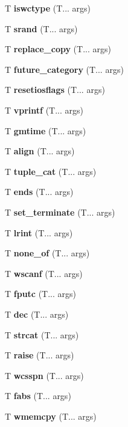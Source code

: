 \begin{DoxyCompactItemize}
T \textbf{ iswctype} (T... args)
\item 
\mbox{\label{srand}} 
T \textbf{ srand} (T... args)
\item 
\mbox{\label{replace_copy}} 
T \textbf{ replace\+\_\+copy} (T... args)
\item 
\mbox{\label{future_category}} 
T \textbf{ future\+\_\+category} (T... args)
\item 
\mbox{\label{resetiosflags}} 
T \textbf{ resetiosflags} (T... args)
\item 
\mbox{\label{vfprintf}} 
T \textbf{ vprintf} (T... args)
\item 
\mbox{\label{gmtime}} 
T \textbf{ gmtime} (T... args)
\item 
\mbox{\label{align}} 
T \textbf{ align} (T... args)
\item 
\mbox{\label{tuple_cat}} 
T \textbf{ tuple\+\_\+cat} (T... args)
\item 
\mbox{\label{ends}} 
T \textbf{ ends} (T... args)
\item 
\mbox{\label{set_terminate}} 
T \textbf{ set\+\_\+terminate} (T... args)
\item 
\mbox{\label{rint}} 
T \textbf{ lrint} (T... args)
\item 
\mbox{\label{all_any_none_of}} 
T \textbf{ none\+\_\+of} (T... args)
\item 
\mbox{\label{fwscanf}} 
T \textbf{ wscanf} (T... args)
\item 
\mbox{\label{fputc}} 
T \textbf{ fputc} (T... args)
\item 
\mbox{\label{hex}} 
T \textbf{ dec} (T... args)
\item 
\mbox{\label{strcat}} 
T \textbf{ strcat} (T... args)
\item 
\mbox{\label{raise}} 
T \textbf{ raise} (T... args)
\item 
\mbox{\label{wcsspn}} 
T \textbf{ wcsspn} (T... args)
\item 
\mbox{\label{fabs}} 
T \textbf{ fabs} (T... args)
\item 
\mbox{\label{wmemcpy}} 
T \textbf{ wmemcpy} (T... args)
\item 

\end{DoxyCompactItemize}
